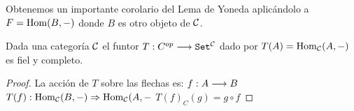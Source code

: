 Obtenemos un importante corolario del Lema de Yoneda aplicándolo a
$F = \operatorname{Hom}(B, -)$ donde $B$ es otro objeto de $\mathcal{C}$.

\begin{theorem}
  Dada una categoría $\mathcal{C}$
  el funtor $T : C^{op}\longrightarrow \texttt{Set}^{\mathcal{C}}$ dado por
  $T(A) = \operatorname{Hom}_{\mathcal{C}}(A, -)$ es fiel y completo.
\end{theorem}
\begin{proof}

  La acción de $T$ sobre las flechas es:
  $f : A\longrightarrow B$
  $T(f) : \operatorname{Hom}_{\mathcal{C}}(B, -)\Rightarrow \operatorname{Hom}_{\mathcal{C}}(A, -$
  $T(f)_C(g) = g \circ f$




\end{proof}
